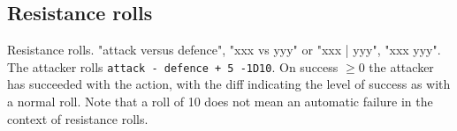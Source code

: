 

\subsection*{Resistance rolls}
Resistance rolls. "attack versus defence", "xxx vs yyy" or "xxx | yyy", "xxx \vs yyy".\\
The attacker rolls \verb|attack - defence + 5 -1D10|. On success $\ge$0 the attacker has succeeded with the action, with the diff indicating the level of success as with a normal roll. Note that a roll of 10 does not mean an automatic failure in the context of resistance rolls.
%














